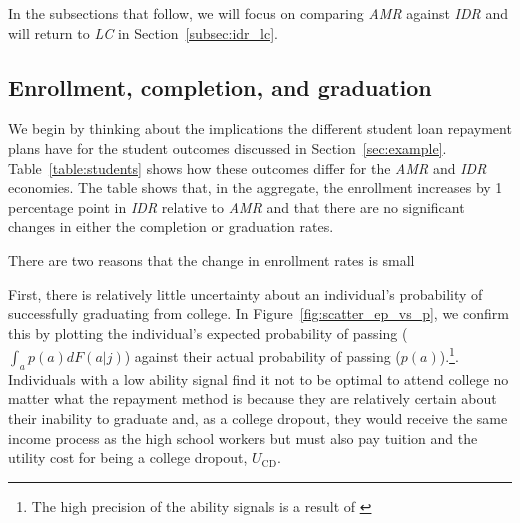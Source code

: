 In the subsections that follow, we will focus on comparing \textit{AMR} against \textit{IDR} and
will return to \textit{LC} in Section~\ref{subsec:idr_lc}.


\subsection{Enrollment, completion, and graduation} \label{subsec:ecg}

  We begin by thinking about the implications the different student loan repayment plans have for
  the student outcomes discussed in Section~\ref{sec:example}. Table~\ref{table:students} shows how
  these outcomes differ for the \textit{AMR} and \textit{IDR} economies. The table shows that, in
  the aggregate, the enrollment increases by 1 percentage point in \textit{IDR} relative to
  \textit{AMR} and that there are no significant changes in either the completion or graduation
  rates.

  There are two reasons that the change in enrollment rates is small

  First, there is relatively little uncertainty about an individual's probability of successfully
  graduating from college. In Figure~\ref{fig:scatter_ep_vs_p}, we confirm this by plotting the
  individual's expected probability of passing ($\int_a p(a) d F(a | j)$) against their actual
  probability of passing ($p(a)$).\footnote{The high precision of the ability signals is a result of
  \cite{HendricksLeukhina2017}}. Individuals with a low ability signal find it not to be optimal to
  attend college no matter what the repayment method is because they are relatively certain about
  their inability to graduate and, as a college dropout, they would receive the same income process
  as the high school workers but must also pay tuition and the utility cost for being a college
  dropout, $U_{\text{CD}}$.

